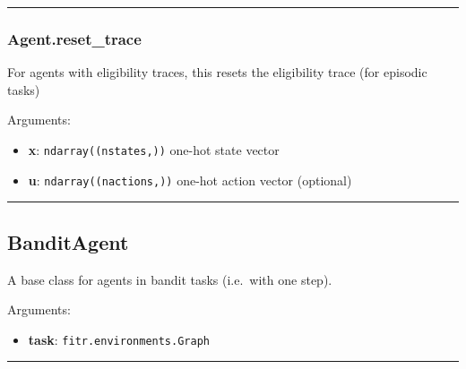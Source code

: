 \begin{center}\rule{0.5\linewidth}{\linethickness}\end{center}

\subsubsection{Agent.reset\_trace}\label{agent.reset_trace}

\begin{Shaded}
\begin{Highlighting}[]
\OperatorTok{=}\NormalTok{)}
\end{Highlighting}
\end{Shaded}

For agents with eligibility traces, this resets the eligibility trace
(for episodic tasks)

Arguments:

\begin{itemize}
\tightlist
\item
  \textbf{x}: \texttt{ndarray((nstates,))} one-hot state vector
\item
  \textbf{u}: \texttt{ndarray((nactions,))} one-hot action vector
  (optional)
\end{itemize}

\begin{center}\rule{0.5\linewidth}{\linethickness}\end{center}

\subsection{BanditAgent}\label{banditagent}

\begin{Shaded}
\begin{Highlighting}[]
\end{Highlighting}
\end{Shaded}

A base class for agents in bandit tasks (i.e.~with one step).

Arguments:

\begin{itemize}
\tightlist
\item
  \textbf{task}: \texttt{fitr.environments.Graph}
\end{itemize}

\begin{center}\rule{0.5\linewidth}{\linethickness}\end{center}

